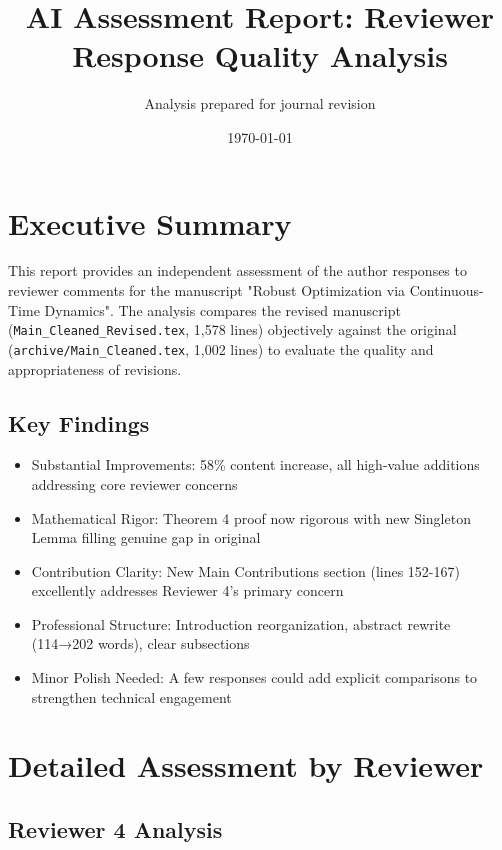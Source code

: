 \documentclass[11pt]{article}
\title{AI Assessment Report: Reviewer Response Quality Analysis}
\author{Analysis prepared for journal revision}
\date{\today}
\begin{document}
\maketitle

\section{Executive Summary}

This report provides an independent assessment of the author responses to reviewer comments for the manuscript "Robust Optimization via Continuous-Time Dynamics". The analysis compares the revised manuscript (\texttt{Main\_Cleaned\_Revised.tex}, 1,578 lines) objectively against the original (\texttt{archive/Main\_Cleaned.tex}, 1,002 lines) to evaluate the quality and appropriateness of revisions.

\subsection{Key Findings}

\begin{itemize}
\item \textcolor{success}{Substantial Improvements}: 58\% content increase, all high-value additions addressing core reviewer concerns
\item \textcolor{success}{Mathematical Rigor}: Theorem 4 proof now rigorous with new Singleton Lemma filling genuine gap in original
\item \textcolor{success}{Contribution Clarity}: New Main Contributions section (lines 152-167) excellently addresses Reviewer 4's primary concern
\item \textcolor{success}{Professional Structure}: Introduction reorganization, abstract rewrite (114→202 words), clear subsections
\item \textcolor{warning}{Minor Polish Needed}: A few responses could add explicit comparisons to strengthen technical engagement
\end{itemize}

\section{Detailed Assessment by Reviewer}

\subsection{Reviewer 4 Analysis}
\end{document}
